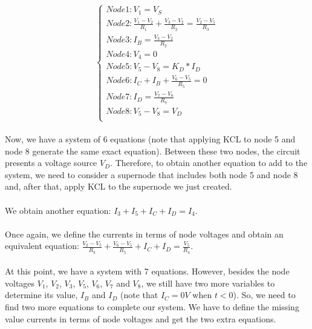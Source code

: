 \[
\left\{\begin{matrix}
Node 1: V_1 = V_S\\
Node 2: \frac{V_1-V_2}{R_1} + \frac{V_3-V_2}{R_2} = \frac{V_2-V_5}{R_3}\\
Node 3: I_B = \frac{V_3-V_2}{R_2}\\
Node 4: V_4 = 0\\
Node 5: V_5 -V_8 = K_D*I_D\\
Node 6: I_C + I_B + \frac{V_6-V_5}{R_5} = 0\\
Node 7: I_D = \frac{V_7-V_8}{R_7}\\
Node 8: V_5 -V_8 = V_D\\
\end{matrix}\right.
\]

\paragraph{}
Now, we have a system of 6 equations (note that applying KCL to node 5 and node 8 generate the same exact equation). Between these two nodes, the circuit presents a voltage source $V_D$. Therefore, to obtain another equation to add to the system, we need to consider a supernode that includes both node 5 and node 8 and, after that, apply KCL to the supernode we just created.

\paragraph{}
We obtain another equation: $ I_3 + I_5 + I_C + I_D = I_4 $.

\paragraph{}
Once again, we define the currents in terms of node voltages and obtain an equivalent equation: $ \frac{V_2-V_5}{R_3}+\frac{V_6-V_5}{R_5} + I_C + I_D = \frac{V_5}{R_4} $.

\paragraph{}
At this point, we have a system with 7 equations. However, besides the node voltages $V_1$, $V_2$, $V_3$, $V_5$, $V_6$, $V_7$ and $V_8$, we still have two more variables to determine its value, $I_B$ and $I_D$ (note that $I_C = 0 V $ when $t < 0$). So, we need to find two more equations to complete our system. We have to define the missing value currents in terms of node voltages and get the two extra equations.

